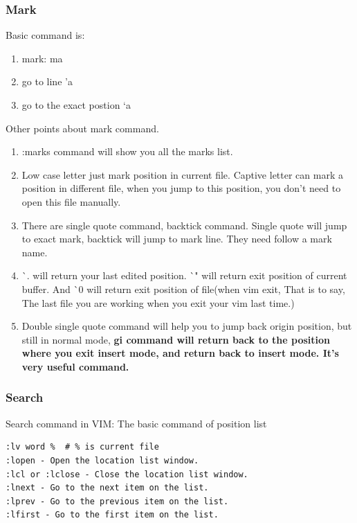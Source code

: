 \documentclass[paper=8.5in:11in, twoside, 12pt, pagesize=pdftex]{book}
\begin{document}
	
\subsubsection{Mark}
		
Basic command is:
		\begin{enumerate}
			\item mark: ma
			\item go to line 'a
			\item go to the exact postion `a
		\end{enumerate}
		
Other points about mark command.	
		\begin{enumerate}
			\item :marks command will show you all the marks list. 
						
			\item Low case letter just mark position in current file. Captive letter can mark a position in different file, when you jump to this position, you don't need to open this file manually.
			
			\item There are single quote command, backtick command. Single quote will jump to exact mark, backtick will jump to mark line. They need follow a mark name.
			
			\item \`{}. will return your last edited position.  \`{}" will return exit position of current buffer. And \`{}0 will return exit position of file(when vim exit, That is to say, The last file you are working when you exit your vim last time.) 
			
			\item Double single quote command will help you to jump back origin position, but still in normal mode, \textbf{gi command will return back to the position where you exit insert mode, and return back to insert mode. It's very useful command. }
			
		\end{enumerate}

\subsubsection{Search}
	
Search command in VIM:
The basic command of position list
\begin{verbatim}
:lv word %  # % is current file 	
:lopen - Open the location list window.
:lcl or :lclose - Close the location list window.
:lnext - Go to the next item on the list.
:lprev - Go to the previous item on the list.
:lfirst - Go to the first item on the list.	
\end{verbatim}			
			
\end{document}
